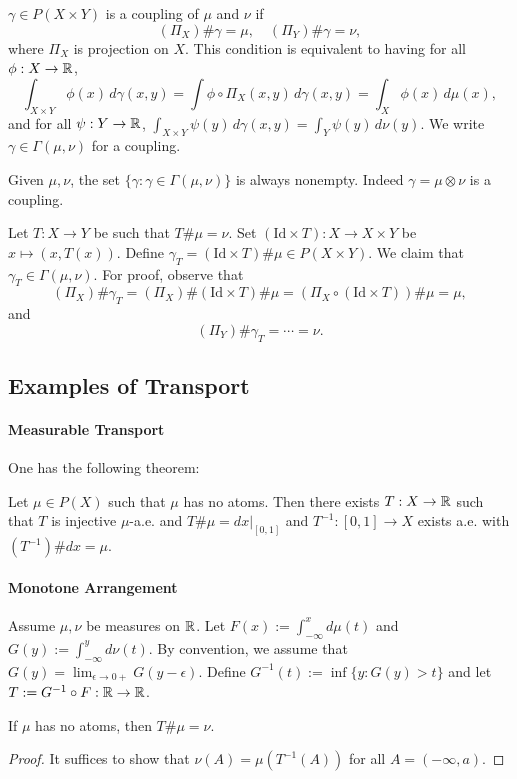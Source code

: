 \documentclass[oneside,leqno,11pt]{amsart}
\numberwithin{equation}{section}
\begin{document}
\begin{definition}[Coupling]
    $\gamma \in P(X\times Y)$ is a coupling of $\mu$ and $\nu$ if 
    \[
        (\Pi_X)\# \gamma = \mu, \quad (\Pi_Y)\# \gamma = \nu,
    \] 
    where $\Pi_X$ is projection on $X$. This condition is equivalent to having for all $\phi:X\to\mathbb{R}$,
    \[
        \int_{X\times Y} \phi(x)\,d\gamma(x,y) = \int \phi \circ \Pi_X(x,y)\,d\gamma(x,y) = \int_X \phi(x)\,d\mu(x),
    \] 
    and for all $\psi:Y\to\mathbb{R}$, $\int_{X\times Y} \psi(y)\,d\gamma(x,y) = \int_Y \psi(y)\,d\nu(y)$.
    We write $\gamma \in \Gamma(\mu, \nu)$ for a coupling.
\end{definition}
\begin{remark}
    Given $\mu, \nu$, the set $\{\gamma : \gamma\in \Gamma(\mu, \nu)\}$ is always nonempty. Indeed $\gamma = \mu\otimes\nu$ is a coupling. 
\end{remark}

\begin{remark}
    Let $T:X\to Y$ be such that $T\#\mu = \nu$. Set $(\mathrm{Id}\times T): X\to X\times Y$ be $x\mapsto (x, T(x))$. Define $\gamma_T = (\mathrm{Id}\times T)\# \mu \in P(X\times Y)$. We claim that $\gamma_T \in \Gamma(\mu, \nu)$. For proof, observe that
    \[
        (\Pi_X)\#\gamma_T = (\Pi_X)\#(\mathrm{Id}\times T)\#\mu = (\Pi_X \circ (\mathrm{Id}\times T))\# \mu = \mu,
    \] 
    and
    \[
        (\Pi_Y)\#\gamma_T = \cdots = \nu.
    \] 
\end{remark}

\subsection{Examples of Transport}
\paragraph{Measurable Transport}
One has the following theorem:
\begin{theorem}
    Let $\mu \in P(X)$ such that $\mu$ has no atoms. Then there exists $T:X\to\mathbb{R}$ such that $T$ is injective $\mu$-a.e. and $T\#\mu = dx|_{[0,1]}$ and $T^{-1}:[0,1]\to X$ exists a.e. with $(T^{-1})\#dx = \mu$.
\end{theorem}

\paragraph{Monotone Arrangement} Assume $\mu, \nu$ be measures on $\mathbb{R}$. Let $F(x) := \int_{-\infty}^x d\mu(t)$ and $G(y) := \int_{-\infty}^y d\nu(t)$. By convention, we assume that $G(y) = \lim_{\epsilon \to 0+} G(y-\epsilon)$. Define $G^{-1}(t) := \inf \{y: G(y) > t\}$ and let $T := G^{-1}\circ F:\mathbb{R}\to \mathbb{R}$.

\begin{theorem}
    If $\mu$ has no atoms, then $T\#\mu = \nu$.
\end{theorem}
\begin{proof}
    It suffices to show that $\nu(A) = \mu(T^{-1}(A))$ for all $A=(-\infty, a)$. 
\end{proof}
\end{document}

